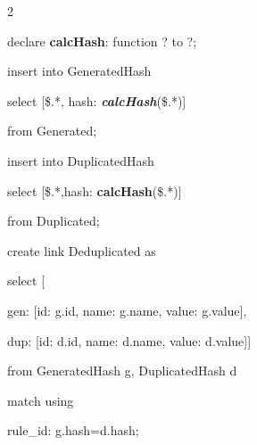 \begin{multicols}{2}
{\sf



\noindent

  declare {\textbf{calcHash}}: function ? to ?;



\noindent

  insert into GeneratedHash



\noindent

  select [\$.*, hash: {\bfseries\textit{calcHash}}(\$.*)]



\noindent

  from Generated;



\noindent

  insert into DuplicatedHash



\noindent

  select [\$.*,hash: {\textbf{calcHash}}(\$.*)]



\noindent

  from Duplicated;



 \vspace*{6pt}



\noindent

  create link Deduplicated as



\noindent

  select [



\noindent

  \hspace*{3pt}gen: [id: g.id, name: g.name, value:   g.value],



\noindent

  \hspace*{3pt}dup: [id: d.id, name: d.name, value: d.value]]



\noindent

  from GeneratedHash g, DuplicatedHash d



\noindent

  match using



\noindent

  \hspace*{3pt}rule\_id: g.hash\;=\;d.hash;



}
\end{multicols}
